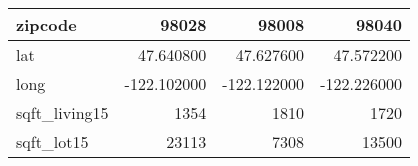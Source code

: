 \begin{table}[H]
\begin{tabular}{|l|r|r|r|}
\hline zipcode & \cellcolor[rgb]{0.9, 0.54, 0.52} 98028 & 98008 & 98040 \\
\hline lat & \cellcolor[rgb]{0.9, 0.54, 0.52} 47.640800 & 47.627600 & 47.572200 \\
\hline long & \cellcolor[rgb]{0.9, 0.54, 0.52} -122.102000 & \cellcolor[rgb]{0.9, 0.54, 0.52} -122.122000 & \cellcolor[rgb]{0.9, 0.54, 0.52} -122.226000 \\
\hline sqft\_living15 & \cellcolor[rgb]{0.9, 0.54, 0.52} 1354 & 1810 & 1720 \\
\hline sqft\_lot15 & \cellcolor[rgb]{0.9, 0.54, 0.52} 23113 & 7308 & 13500 \\
\hline
\end{tabular}
\end{table}
